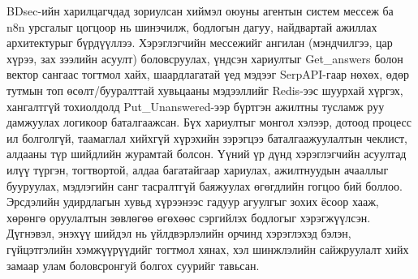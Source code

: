 \documentclass[12pt,A4]{report}
\begin{document}
   BDsec-ийн харилцагчдад зориулсан хиймэл оюуны агентын систем мессеж ба n8n урсгалыг цогцоор нь шинэчилж, бодлогын дагуу, найдвартай ажиллах архитектурыг бүрдүүллээ. Хэрэглэгчийн мессежийг ангилан (мэндчилгээ, цар хүрээ, зах зээлийн асуулт) боловсруулах, үндсэн хариултыг Get\_answers болон вектор сангаас тогтмол хайх, шаардлагатай үед мэдээг SerpAPI-гаар нөхөх, өдөр тутмын топ өсөлт/бууралттай хувьцааны мэдээллийг Redis-ээс шуурхай хүргэх, хангалтгүй тохиолдолд Put\_Unanswered-ээр бүртгэн ажилтны тусламж руу дамжуулах логикоор баталгаажсан. Бүх хариултыг монгол хэлээр, дотоод процесс ил болголгүй, таамаглал хийхгүй хүрэхийн зэрэгцээ баталгаажуулалтын чеклист, алдааны түр шийдлийн журамтай болсон. Үүний үр дүнд хэрэглэгчийн асуултад илүү түргэн, тогтвортой, алдаа багатайгаар хариулах, ажилтнуудын ачааллыг бууруулах, мэдлэгийн санг тасралтгүй баяжуулах өгөгдлийн гогцоо бий боллоо. Эрсдэлийн удирдлагын хувьд хүрээнээс гадуур агуулгыг зохих ёсоор хааж, хөрөнгө оруулалтын зөвлөгөө өгөхөөс сэргийлэх бодлогыг хэрэгжүүлсэн. Дүгнэвэл, энэхүү шийдэл нь үйлдвэрлэлийн орчинд хэрэглэхэд бэлэн, гүйцэтгэлийн хэмжүүрүүдийг тогтмол хянах, хэл шинжлэлийн сайжруулалт хийх замаар улам боловсронгуй болгох суурийг тавьсан.


\renewcommand{\bibname}{\begin{center}\textbf{НОМ ЗҮЙ}\end{center}}

\end{document}
